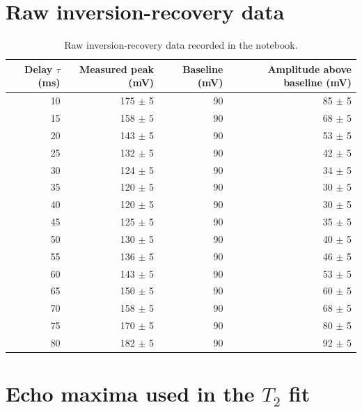 \documentclass[11pt]{article}
\begin{document}
\appendix

\section{Raw inversion-recovery data}

\begin{table}[H]
\centering
\caption{Raw inversion-recovery data recorded in the notebook.}
\label{tab:rawt1}
\begin{tabular}{@{}rrrr@{}}
\toprule
\textbf{Delay $\tau$ (ms)} & \textbf{Measured peak (mV)} & \textbf{Baseline (mV)} & \textbf{Amplitude above baseline (mV)} \\
\midrule
10 & 175 $\pm$ 5 & 90 & 85 $\pm$ 5 \\
15 & 158 $\pm$ 5 & 90 & 68 $\pm$ 5 \\
20 & 143 $\pm$ 5 & 90 & 53 $\pm$ 5 \\
25 & 132 $\pm$ 5 & 90 & 42 $\pm$ 5 \\
30 & 124 $\pm$ 5 & 90 & 34 $\pm$ 5 \\
35 & 120 $\pm$ 5 & 90 & 30 $\pm$ 5 \\
40 & 120 $\pm$ 5 & 90 & 30 $\pm$ 5 \\
45 & 125 $\pm$ 5 & 90 & 35 $\pm$ 5 \\
50 & 130 $\pm$ 5 & 90 & 40 $\pm$ 5 \\
55 & 136 $\pm$ 5 & 90 & 46 $\pm$ 5 \\
60 & 143 $\pm$ 5 & 90 & 53 $\pm$ 5 \\
65 & 150 $\pm$ 5 & 90 & 60 $\pm$ 5 \\
70 & 158 $\pm$ 5 & 90 & 68 $\pm$ 5 \\
75 & 170 $\pm$ 5 & 90 & 80 $\pm$ 5 \\
80 & 182 $\pm$ 5 & 90 & 92 $\pm$ 5 \\
\bottomrule
\end{tabular}
\end{table}

\section{Echo maxima used in the $T_2$ fit}
\end{document}
